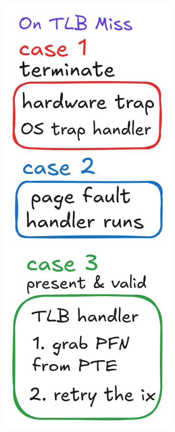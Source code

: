 \begin{minipage}{.28\linewidth}
  \includegraphics[width=\linewidth]{imgs/swap_cases}
\end{minipage}
